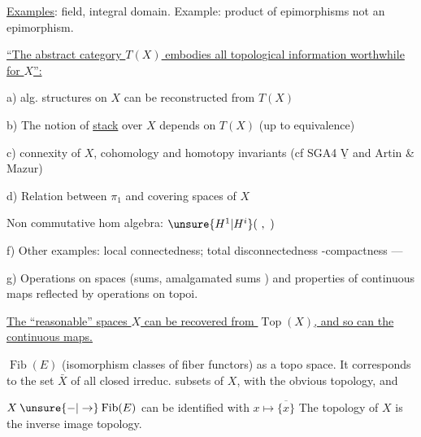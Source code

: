 

\uline{Examples}: field, integral domain.
Example: product of epimorphisms not an epimorphism.

\uline{``The abstract category $T(X)$ embodies all topological information worthwhile for $X$'':}

a)   alg. structures on $X$ can be reconstructed from $T(X)$

b) The notion of \uline{stack} over $X$ depends on $T(X)$ 
(up to equivalence)

c) connexity of $X$,  cohomology and homotopy
invariants (cf SGA4 $\underline{\mathrm V}$ and Artin \& Mazur)

d) Relation between $\pi_1$ and covering spaces of $X$

 Non commutative hom algebra: $\unsure{H^1|H^i}(\ ,\ )$

f) Other examples: local connectedness; total disconnectedness
-compactness ---

g) Operations on spaces (sums, amalgamated sums \inserted{---})
and properties of  continuous maps reflected
by operations on topoi.

\uline{The ``reasonable'' spaces $X$ can be recovered from $\operatorname{Top}(X)$, and so can the continuous maps.}


$\operatorname{Fib}(E)$ (isomorphism classes of  fiber functors) as a
topo space. It corresponds to the set $\bar X$ of
all closed irreduc. subsets of $X$, with the
obvious topology, and


$X\mathbin{\unsure{-|\to}}\operatorname{Fib}(E)$ can be identified with $x\longmapsto\overline{\{x\}}$
The topology of $X$ is the inverse image topology.

